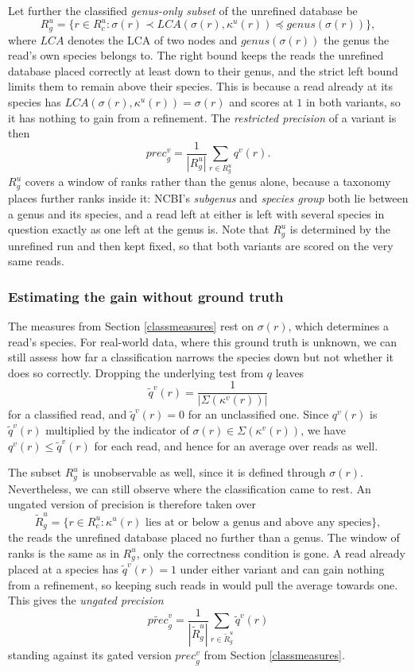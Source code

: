 \documentclass[pdflatex,sn-vancouver-num]{sn-jnl}
\begin{document}
    Let further the classified \emph{genus-only subset} of the unrefined database be
\[ R^u_g = \{ r \in R^u_c : \sigma(r) \prec \mathit{LCA}(\sigma(r), \kappa^u(r)) \preceq \mathit{genus}(\sigma(r)) \} , \]
    where $\mathit{LCA}$ denotes the LCA of two nodes and $\mathit{genus}(\sigma(r))$ the genus the read's own species belongs to. The right bound keeps the reads the unrefined database placed correctly at least down to their genus, and the strict left bound limits them to remain above their species. This is because a read already at its species has $\mathit{LCA}(\sigma(r), \kappa^u(r)) = \sigma(r)$ and scores at $1$ in both variants, so it has nothing to gain from a refinement. The \emph{restricted precision} of a variant is then
\[ \mathit{prec}^v_g = \frac{1}{|R^u_g|} \sum_{r \in R^u_g} q^v(r) . \]
    $R^u_g$ covers a window of ranks rather than the genus alone, because a taxonomy places further ranks inside it: NCBI's \emph{subgenus} and \emph{species group} both lie between a genus and its species, and a read left at either is left with several species in question exactly as one left at the genus is. Note that $R^u_g$ is determined by the unrefined run and then kept fixed, so that both variants are scored on the very same reads.

    \subsubsection{Estimating the gain without ground truth}\label{groundtruthfree}

    The measures from Section \ref{classmeasures} rest on $\sigma(r)$, which determines a read's species. For real-world data, where this ground truth is unknown, we can still assess how far a classification narrows the species down but not whether it does so correctly. Dropping the underlying test from $q$ leaves
\[ \tilde{q}^v(r) = \frac{1}{|\Sigma(\kappa^v(r))|} \]
    for a classified read, and $\tilde{q}^v(r) = 0$ for an unclassified one. Since $q^v(r)$ is $\tilde{q}^v(r)$ multiplied by the indicator of $\sigma(r) \in \Sigma(\kappa^v(r))$, we have $q^v(r) \le \tilde{q}^v(r)$ for each read, and hence for an average over reads as well.

    The subset $R^u_g$ is unobservable as well, since it is defined through $\sigma(r)$. Nevertheless, we can still observe where the classification came to rest. An ungated version of precision is therefore taken over
\[ \widetilde{R}^u_g = \{ r \in R^u_c : \kappa^u(r) \text{ lies at or below a genus and above any species} \} , \]
    the reads the unrefined database placed no further than a genus. The window of ranks is the same as in $R^u_g$, only the correctness condition is gone. A read already placed at a species has $\tilde{q}^v(r) = 1$ under either variant and can gain nothing from a refinement, so keeping such reads in would pull the average towards one. This gives the \emph{ungated precision}
\[ \widetilde{\mathit{prec}}^v_g = \frac{1}{|\widetilde{R}^u_g|} \sum_{r \in \widetilde{R}^u_g} \tilde{q}^v(r) \]
    standing against its gated version $\mathit{prec}^v_g$ from Section \ref{classmeasures}.
\end{document}
